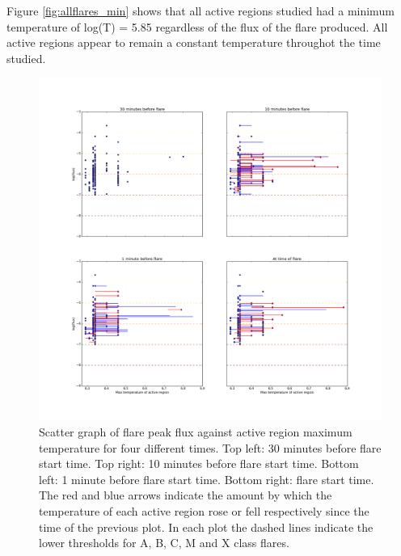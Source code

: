 \documentclass[referee,a4paper,12pt]{swsc}
\begin{document}
\begin{linenumbers}
Figure \ref{fig:allflares_min} shows that all active regions studied had a minimum temperature of log(T) = 5.85 regardless of the flux of the flare produced.
All active regions appear to remain a constant temperature throughot the time studied.

\begin{figure}
	\centering
		\includegraphics[width=0.9\columnwidth]{tempplotsmax/allflares.png}
	\caption{Scatter graph of flare peak flux against active region maximum temperature for four different times. Top left: 30 minutes before flare start time. Top right: 10 minutes before flare start time. Bottom left: 1 minute before flare start time. Bottom right: flare start time. The red and blue arrows indicate the amount by which the temperature of each active region rose or fell respectively since the time of the previous plot. In each plot the dashed lines indicate the lower thresholds for A, B, C, M and X class flares.}
	\label{fig:allflares_max}
\end{figure}
\begin{figure}
	\centering

\end{figure}
\end{linenumbers}
\end{document}
